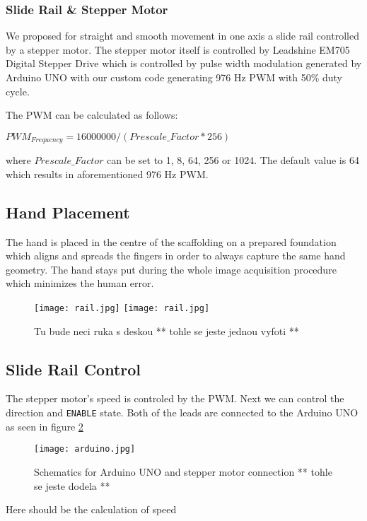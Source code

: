 \subsubsection*{Slide Rail \& Stepper Motor}
We proposed for straight and smooth movement in one axis a slide rail controlled by a stepper motor. The stepper motor itself is controlled by Leadshine EM705 Digital Stepper Drive which is controlled by pulse width modulation generated by Arduino UNO with our custom code generating 976 Hz PWM with 50\% duty cycle.

The PWM can be calculated as follows:

$PWM_{Frequency} = 16000000 / (Prescale\_Factor * 256)$

where $Prescale\_Factor$ can be set to 1, 8, 64, 256 or 1024. The default value is 64 which results in aforementioned 976 Hz PWM.

\subsection{Hand Placement}
The hand is placed in the centre of the scaffolding on a prepared foundation which aligns and spreads the fingers in order to always capture the same hand geometry. The hand stays put during the whole image acquisition procedure which minimizes the human error.

\begin{figure}[h]
    \label{fig:rail}
    \centering
    \texttt{[image: rail.jpg]}
    \texttt{[image: rail.jpg]}
    \caption{Tu bude neci ruka s deskou ** tohle se jeste jednou vyfoti **}
\end{figure}


\subsection{Slide Rail Control}
The stepper motor's speed is controled by the PWM. Next we can control the direction and \texttt{ENABLE} state. Both of the leads are connected to the Arduino UNO as seen in figure \ref{fig:arduino}

\begin{figure}[h]
    \label{fig:arduino}
    \centering
    \texttt{[image: arduino.jpg]}
    \caption{Schematics for Arduino UNO and stepper motor connection ** tohle se jeste dodela **}
\end{figure}

{\LARGE Here should be the calculation of speed}

